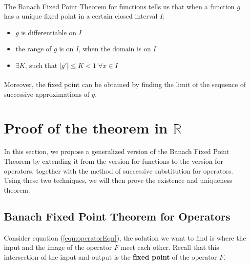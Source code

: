 \documentclass{article}
\theoremstyle{definition}
\theoremstyle{remark}
\theoremstyle{example}
\begin{document}
\paragraph{   }

The Banach Fixed Point Theorem for functions tells us that when a function $g$ has a unique fixed point in a certain closed interval $I$:
\begin{itemize}
    \item $g$ is differentiable on $I$
    \item the range of $g$ is on $I$, when the domain is on $I$
    \item $\exists K$, such that $\lvert g' \rvert \leq K < 1 \; \forall x \in I$
\end{itemize}

\paragraph{  }

Moreover, the fixed point can be obtained by finding the limit of the sequence of successive approximations of $g$.

\section{Proof of the theorem in $\mathbb{R}$}

\paragraph{  }
In this section, we propose a generalized version of the Banach Fixed Point Theorem by extending it from the version for functions to the version for operators, together with the method of successive substitution for operators. Using these two techniques, we will then prove the existence and uniqueness theorem.

\subsection{Banach Fixed Point Theorem for Operators}

\paragraph{  }

Consider equation (\ref{eqn:operatorEqn}), the solution we want to find is where the input and the image of the operator $F$ meet each other. Recall that this intersection of the input and output is the \textbf{fixed point} of the operator $F$. 
\end{document}
